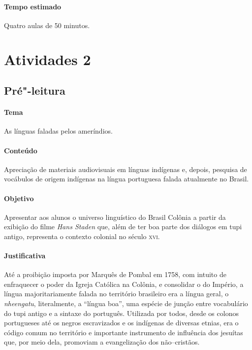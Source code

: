\documentclass[12pt]{extarticle}
\begin{document}
{\paragraph{Tempo estimado} Quatro aulas de 50 minutos.




\section{Atividades 2}




\subsection{Pré"-leitura}

\paragraph{Tema} As línguas faladas pelos ameríndios. 

\paragraph{Conteúdo} Apreciação de materiais audiovisuais em línguas
indígenas e, depois, pesquisa de vocábulos de origem indígenas na língua
portuguesa falada atualmente no Brasil.

\paragraph{Objetivo} Apresentar aos alunos o universo linguístico do Brasil
Colônia a partir da exibição do filme \emph{Hans Staden} que, além de 
ter boa parte dos diálogos em tupi antigo, representa o contexto colonial
no século \textsc{xvi}.

\paragraph{Justificativa} Até a proibição imposta por Marquês de Pombal
em 1758, com intuito de enfraquecer o poder da Igreja Católica na Colônia,
e consolidar o do Império, a língua majoritariamente falada no território 
brasileiro era a língua geral, o \emph{nheengatu}, literalmente, a 
``língua boa'', uma espécie de junção entre vocabulário do tupi antigo e 
a sintaxe do português. Utilizada por todos, desde os colonos portugueses 
até os negros escravizados e os indígenas de diversas etnias, era o
código comum no território e importante instrumento de influência dos
jesuítas que, por meio dela, promoviam a evangelização dos não--cristãos.

}
\end{document}
